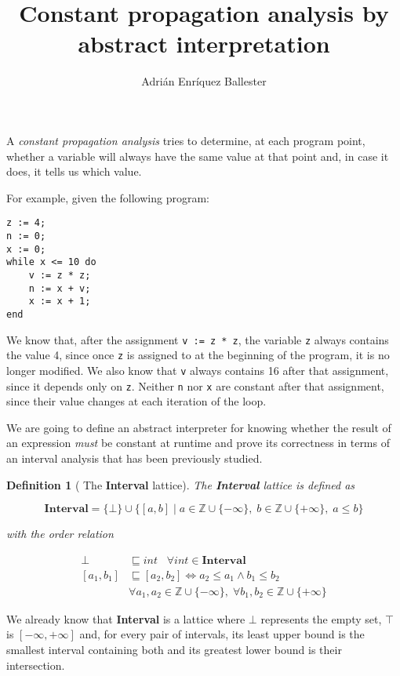 \documentclass{article}
\title{Constant propagation analysis by abstract interpretation}
\author{Adrián Enríquez Ballester}
\newtheorem{definition}{Definition}
\begin{document}
\maketitle

A \textit{constant propagation analysis} tries to determine, at 
each program point, whether a variable will always have the same 
value at that point and, in case it does, it tells us which value.

For example, given the following program:

\begin{Verbatim}
z := 4;
n := 0;
x := 0;
while x <= 10 do
    v := z * z;
    n := x + v;
    x := x + 1;
end
\end{Verbatim}

We know that, after the assignment \Verb|v := z * z|, the variable
\Verb|z| always contains the value 4, since once \Verb|z| is 
assigned to at the beginning of the program, it is no longer 
modified. We also know that \Verb|v| always contains 16 after that
assignment, since it depends only on \Verb|z|. Neither \Verb|n| 
nor \Verb|x| are constant after that assignment, since their value
changes at each iteration of the loop.

We are going to define an abstract interpreter for knowing whether
the result of an expression \textit{must} be constant at runtime 
and prove its correctness in terms of an interval analysis that 
has been previously studied.

\begin{definition}[
  The \textbf{Interval} lattice
]\label{def:ilattice}
  The \textbf{Interval} lattice is defined as

  $$
    \textbf{Interval} = 
      \{\bot\} \cup 
      \{[a, b] \;
        | \; a \in \mathbb{Z} \cup \{-\infty\}
        , \; b \in \mathbb{Z} \cup \{+\infty\}
        , \; a \leq b 
      \}
  $$

  with the order relation

  \begin{align*}
    \bot &\sqsubseteq int \;\;\; 
      \forall int \in \textbf{Interval} \\ 
    [a_1, b_1] &\sqsubseteq [a_2, b_2] 
      \iff a_2 \leq a_1 \land b_1 \leq b_2 \\
        &\forall a_1, a_2 \in \mathbb{Z} \cup \{-\infty\}, 
      \; \forall b_1, b_2 \in \mathbb{Z} \cup \{+\infty\}
  \end{align*}
\end{definition}

We already know that \textbf{Interval} is a lattice where 
$\bot$ represents the empty set, $\top$ is $[-\infty, +\infty]$
and, for every pair of intervals, its least upper bound is the 
smallest interval containing both and its greatest lower bound 
is their intersection.
\end{document}
